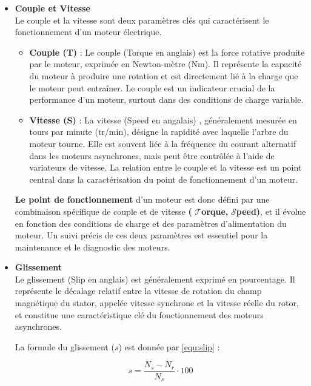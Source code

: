 \begin{itemize}

  \item \textbf{Couple et Vitesse} \\
        Le couple et la vitesse sont deux paramètres clés qui caractérisent le fonctionnement d'un moteur électrique.
        \begin{itemize}
          \item \textbf{Couple (T)} : Le couple (Torque en anglais) est la force rotative produite par le moteur, exprimée en Newton-mètre (Nm). Il représente la capacité du moteur à produire une rotation et est directement lié à la charge que le moteur peut entraîner. Le couple est un indicateur crucial de la performance d'un moteur, surtout dans des conditions de charge variable.
          \item \textbf{Vitesse (S)} : La vitesse (Speed en angalais) , généralement mesurée en tours par minute (tr/min), désigne la rapidité avec laquelle l'arbre du moteur tourne. Elle est souvent liée à la fréquence du courant alternatif dans les moteurs asynchrones, mais peut être contrôlée à l'aide de variateurs de vitesse. La relation entre le couple et la vitesse est un point central dans la caractérisation du point de fonctionnement d'un moteur.
        \end{itemize}
        \textbf{Le point de fonctionnement} d'un moteur est donc défini par une combinaison spécifique de couple et de vitesse \textbf{(} $\mathcal{T}$\textbf{orque, }$\mathcal{S}$\textbf{peed)}, et il évolue en fonction des conditions de charge et des paramètres d'alimentation du moteur. Un suivi précis de ces deux paramètres est essentiel pour la maintenance et le diagnostic des moteurs.

  \item \textbf{Glissement} \\
        Le glissement (Slip en anglais) est généralement exprimé en pourcentage. Il représente le décalage relatif  entre la vitesse de rotation du champ magnétique du stator, appelée vitesse synchrone  et la vitesse réelle du rotor, et constitue une caractéristique clé du fonctionnement des moteurs asynchrones.

        La formule du glissement (\(s\)) est donnée par \ref{equ:slip} :

        \begin{equation}
          s = \frac{N_s - N_r}{N_s} \cdot 100
          \label{equ:slip}
        \end{equation}


\end{itemize}

